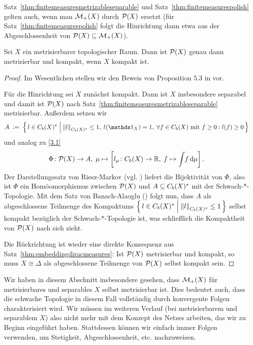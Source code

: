 \documentclass[../main/main.tex]{subfiles}
\begin{document}
	\begin{Bemerkung}
		Satz~\ref{thm:finitemeasuresmetrizableseparable} und Satz~\ref{thm:finitemeasurespolish} gelten auch, wenn man $\mathcal{M}_{+}(X)$ durch $\mathcal{P}(X)$ ersetzt 
		(für Satz~\ref{thm:finitemeasurespolish} folgt die Hinrichtung dann etwa aus der Abgeschlossenheit von $\mathcal{P}(X) \subseteq \mathcal{M}_{+}(X)$).
	\end{Bemerkung}

	\begin{Satz}
		\label{thm:compactimpliescompactmeasures}
		Sei $X$ ein metrisierbarer topologischer Raum. Dann ist $\mathcal{P}(X)$ genau dann metrisierbar und kompakt, wenn $X$ kompakt ist.
	\end{Satz}
	
	\begin{proof}
		Im Wesentlichen stellen wir den Beweis von Proposition 5.3 in \cite{vanGaans.200203} vor.
		
		Für die Hinrichtung sei $X$ zunächst kompakt. Dann ist $X$ insbesondere separabel und damit ist $\mathcal{P}(X)$ 
		nach Satz~\ref{thm:finitemeasuresmetrizableseparable} metrisierbar.
		Außerdem setzen wir
		\[ A \; \defby \; \setcomp{l \in \Bdcontfct{X}^\ast}{\norm{l}_{\Bdcontfct{X}^\ast} \leq 1, \; l(\indfct_{X}) = 1, \; 
			\forall f \in \Bdcontfct{X} \text{ mit } f \geq 0 : l(f) \geq 0}\]
		und analog zu \eqref{3.1}
		\[ \Phi \colon \mathcal{P}(X) \to A, \; \mu \mapsto \left[l_\mu \colon C_b(X) \to \mathbb{R}, \; f \mapsto \int_{} \, f \, \mathrm{d}\mu \right]  \text{.} \]
		Der Darstellungssatz von Riesz-Markov (vgl. \cite[Satz 4.8.8]{Simon.2015}) liefert die Bijektivität von $\Phi$, also ist $\Phi$ ein 
		Homöomorphismus zwischen $\mathcal{P}(X)$ und $A \subseteq C_b(X)^\ast$ 
		mit der Schwach-$\ast$-Topologie. Mit dem Satz von Banach-Alaoglu (\cite[Satz 5.8.1]{Simon.2015}) folgt nun, dass $A$ als abgeschlossene Teilmenge des Kompaktums 
		$\left\{\, l \in C_b(X)^\ast \; \middle| \; \left\lVert l\right\rVert_{C_b(X)^\ast} \leq 1 \,\right\}$ selbst kompakt bezüglich der Schwach-$\ast$-Topologie ist, 
		was schließlich die Kompaktheit von $\mathcal{P}(X)$ nach sich zieht.
		
		Die Rückrichtung ist wieder eine direkte Konsequenz aus Satz~\ref{thm:embeddingdiracmeasures}: Ist $\mathcal{P}(X)$ metrisierbar und kompakt, so muss 
		$X \cong \Delta$ als abgeschlossene Teilmenge von $\mathcal{P}(X)$ selbst kompakt sein.
	\end{proof}

	\begin{Bemerkung}
		Wir haben in diesem Abschnitt insbesondere gesehen, dass $\mathcal{M}_{+}(X)$ für metrisierbares und separables $X$ selbst metrisierbar ist. Dies bedeutet auch, dass die schwache Topologie
		in diesem Fall vollständig durch konvergente Folgen charakterisiert wird. Wir müssen im weiteren Verlauf (bei metrisierbarem und separablem $X$) also nicht mehr mit dem Konzept des Netzes arbeiten, das wir zu Beginn eingeführt haben. Stattdessen
		können wir einfach immer Folgen verwenden, um Stetigkeit, Abgeschlossenheit, etc. nachzuweisen.
	\end{Bemerkung}
	
\end{document}
